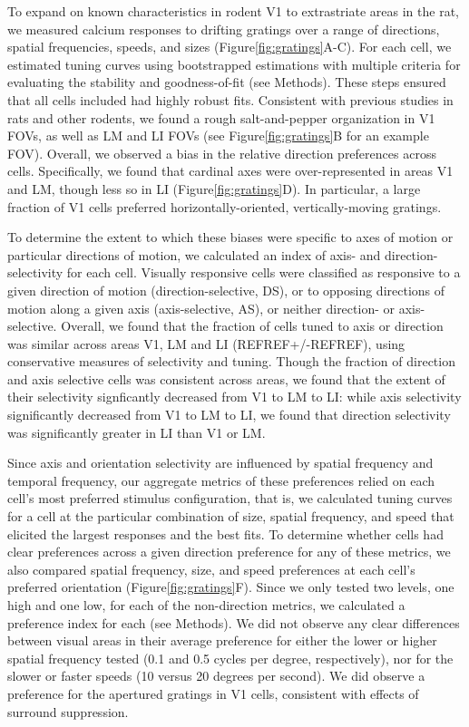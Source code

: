To expand on known characteristics in rodent V1 to extrastriate areas in the rat, we measured calcium responses to drifting gratings over a range of directions, spatial frequencies, speeds, and sizes (Figure\ref{fig:gratings}A-C). For each cell, we estimated tuning curves using bootstrapped estimations with multiple criteria for evaluating the stability and goodness-of-fit (see Methods)\cite{Liang2018}. These steps ensured that all cells included had highly robust fits. Consistent with previous studies in rats and other rodents, we found a rough salt-and-pepper organization in V1 FOVs, as well as LM and LI FOVs (see Figure\ref{fig:gratings}B for an example FOV). Overall, we observed a bias in the relative direction preferences across cells. Specifically, we found that cardinal axes were over-represented in areas V1 and LM, though less so in LI (Figure\ref{fig:gratings}D). In particular, a large fraction of V1 cells preferred horizontally-oriented, vertically-moving gratings.  

To determine the extent to which these biases were specific to axes of motion or particular directions of motion, we calculated an index of axis- and direction-selectivity for each cell. Visually responsive cells were classified as responsive to a given direction of motion (direction-selective, DS), or to opposing directions of motion along a given axis (axis-selective, AS), or neither direction- or axis-selective. Overall, we found that the fraction of cells tuned to axis or direction was similar across areas V1, LM and LI (REFREF+/-REFREF), using conservative measures of selectivity and tuning. Though the fraction of direction and axis selective cells was consistent across areas,  we found that the extent of their selectivity signficantly decreased from V1 to LM to LI: while axis selectivity significantly decreased from V1 to LM to LI, we found that direction selectivity was significantly greater in LI than V1 or LM. 

Since axis and orientation selectivity are influenced by spatial frequency and temporal frequency\cite{REFREF}, our aggregate metrics of these preferences relied on each cell's most preferred stimulus configuration, that is, we calculated tuning curves for a cell at the particular combination of size, spatial frequency, and speed that elicited the largest responses and the best fits. To determine whether cells had clear preferences across a given direction preference for any of these metrics, we also compared spatial frequency, size, and speed preferences at each cell's preferred orientation (Figure\ref{fig:gratings}F). Since we only tested two levels, one high and one low, for each of the non-direction metrics, we calculated a preference index for each (see Methods). We did not observe any clear differences between visual areas in their average preference for either the lower or higher spatial frequency tested (0.1 and 0.5 cycles per degree, respectively), nor for the slower or faster speeds (10 versus 20 degrees per second). We did observe a preference for the apertured gratings in V1 cells, consistent with effects of surround suppression.

